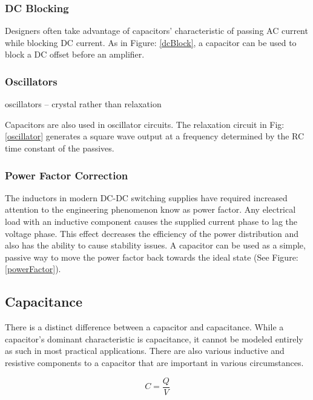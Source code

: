 \subsubsection{DC Blocking}

Designers often take advantage of capacitors' characteristic of passing AC current while blocking DC current. As in Figure: \ref{dcBlock}, a capacitor can be used to block a DC offset before an amplifier.

\subsubsection{Oscillators}
    oscillators -- crystal rather than relaxation


Capacitors are also used in oscillator circuits. The relaxation circuit in Fig: \ref{oscillator} generates a square wave output at a frequency determined by the RC time constant of the passives.

\subsubsection{Power Factor Correction}


The inductors in modern DC-DC switching supplies have required increased attention to the engineering phenomenon know as power factor. Any electrical load with an inductive component causes the supplied current phase to lag the voltage phase. This effect decreases the efficiency of the power distribution and also has the ability to cause stability issues. A capacitor can be used as a simple, passive way to move the power factor back towards the ideal state (See Figure: \ref{powerFactor}). \cite{cui_powerFactor}


\subsection{Capacitance}

There is a distinct difference between a capacitor and capacitance. While a capacitor's dominant characteristic is capacitance, it cannot be modeled entirely as such in most practical applications. There are also various inductive and resistive components to a capacitor that are important in various circumstances.

\begin{equation}
\label{cqv}
C=\frac{Q}{V}
\end{equation}

